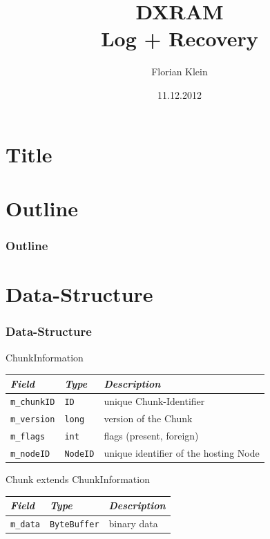 \documentclass{beamer}
\title[DXRAM]{DXRAM\\Log + Recovery}
\author{Florian Klein}
\institute[Universität Düsseldorf] {Institut für Informatik\\Abteilung Betriebssysteme\\Heinrich-Heine-Universität Düsseldorf}
\date{11.12.2012}
\begin{document}
\section*{Title}

	\begin{frame}
		\titlepage
	\end{frame}

\section*{Outline}

	\begin{frame}
		\frametitle{Outline}

		\tableofcontents[hideallsubsections]
	\end{frame}

\section{Data-Structure}

	\begin{frame}
		\frametitle{Data-Structure}

		\begin{block}{ChunkInformation}
			\begin{tabular}{|l|l|l|}
				\hline
				\emph{Field}		&\emph{Type}		&\emph{Description}			\\\hline
				\texttt{m\_chunkID}	&\texttt{ID}		&unique Chunk-Identifier		\\\hline
				\texttt{m\_version}	&\texttt{long}		&version of the Chunk			\\\hline
				\texttt{m\_flags}	&\texttt{int}		&flags (present, foreign)		\\\hline
				\texttt{m\_nodeID}	&\texttt{NodeID}	&unique identifier of the hosting Node	\\\hline
			\end{tabular}
		\end{block}

		\begin{block}{Chunk extends ChunkInformation}
			\begin{tabular}{|l|l|l|}
				\hline
				\emph{Field}		&\emph{Type}		&\emph{Description}	\\\hline
				\texttt{m\_data}	&\texttt{ByteBuffer}	&binary data		\\\hline
			\end{tabular}
		\end{block}
	\end{frame}
\end{document}
